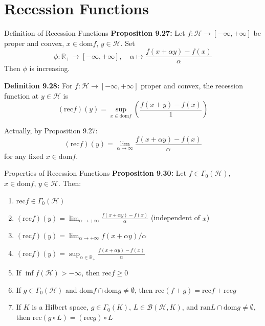 \documentclass[aspectratio=169,10pt]{beamer}
\begin{document}
\section{Recession Functions}

\begin{frame}{Definition of Recession Functions}
\textbf{Proposition 9.27:} Let $f: \mathcal{H} \to [-\infty, +\infty]$ be proper and convex, $x \in \text{dom} f$, $y \in \mathcal{H}$. Set
\[
\phi: \mathbb{R}_+ \to [-\infty, +\infty], \quad \alpha \mapsto \frac{f(x + \alpha y) - f(x)}{\alpha}
\]
Then $\phi$ is increasing.

\vspace{0.3cm}
\textbf{Definition 9.28:} For $f: \mathcal{H} \to [-\infty, +\infty]$ proper and convex, the \alert{recession function} at $y \in \mathcal{H}$ is
\[
(\text{rec} f)(y) = \sup_{x \in \text{dom} f} \left(\frac{f(x + y) - f(x)}{1}\right)
\]

Actually, by Proposition 9.27:
\[
(\text{rec} f)(y) = \lim_{\alpha \to \infty} \frac{f(x + \alpha y) - f(x)}{\alpha}
\]
for any fixed $x \in \text{dom} f$.
\end{frame}

\begin{frame}{Properties of Recession Functions}
\textbf{Proposition 9.30:} Let $f \in \Gamma_0(\mathcal{H})$, $x \in \text{dom} f$, $y \in \mathcal{H}$. Then:
\begin{enumerate}
    \item $\text{rec} f \in \Gamma_0(\mathcal{H})$
    \item $(\text{rec} f)(y) = \lim_{\alpha \to +\infty} \frac{f(x + \alpha y) - f(x)}{\alpha}$ (independent of $x$)
    \item $(\text{rec} f)(y) = \lim_{\alpha \to +\infty} f(x + \alpha y) / \alpha$
    \item $(\text{rec} f)(y) = \sup_{\alpha \in \mathbb{R}_+} \frac{f(x + \alpha y) - f(x)}{\alpha}$
    \item If $\inf f(\mathcal{H}) > -\infty$, then $\text{rec} f \geq 0$
    \item If $g \in \Gamma_0(\mathcal{H})$ and $\text{dom} f \cap \text{dom} g \neq \emptyset$, then $\text{rec}(f + g) = \text{rec} f + \text{rec} g$
    \item If $K$ is a Hilbert space, $g \in \Gamma_0(K)$, $L \in \mathcal{B}(\mathcal{H}, K)$, and $\text{ran} L \cap \text{dom} g \neq \emptyset$, then $\text{rec}(g \circ L) = (\text{rec} g) \circ L$
\end{enumerate}
\end{frame}
\end{document}
